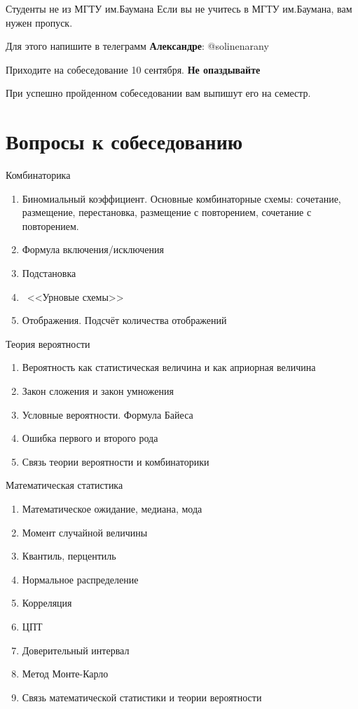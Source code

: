\documentclass{beamer}
\newcommand{\рис}[1]{рис.\ref{#1}}
\newcommand{\Рис}[1]{Рис.\ref{#1}}
\newcommand{\таблицa}[1]{таблица~№\ref{#1}} %
\newcommand{\таблицы}[1]{таблицы~№\ref{#1}} %
\newcommand{\таблице}[1]{таблице~№\ref{#1}} %
\newcommand{\таблицу}[1]{таблицу~№\ref{#1}} %
\newcommand{\таблицей}[1]{таблицей~№\ref{#1}} %
\newcommand{\Таблицa}[1]{Таблица~№\ref{#1}} %
\newcommand{\Таблицы}[1]{Таблицы~№\ref{#1}} %
\newcommand{\Таблице}[1]{Таблице~№\ref{#1}} %
\newcommand{\Таблицу}[1]{Таблицу~№\ref{#1}} %
\newcommand{\Таблицей}[1]{Таблицей~№\ref{#1}} %
\begin{document}
  \begin{frame}{Студенты не из МГТУ им.Баумана}
  Если вы не учитесь в МГТУ им.Баумана, вам нужен пропуск.
  
  Для этого напишите в телеграмм \textbf{Александре}: @solinenarany
  
  Приходите на собеседование 10 сентября. 
  \textbf{Не опаздывайте}
  
  При успешно пройденном собеседовании вам выпишут его на семестр.
  \end{frame}
  
  \section{Вопросы к собеседованию}\label{section:quastions}
  
  \begin{frame}{Комбинаторика}
  \begin{enumerate}
  	\item Биномиальный коэффициент. Основные комбинаторные схемы: сочетание, размещение, перестановка, размещение с повторением, сочетание с повторением.
  	\item Формула включения/исключения
  	\item Подстановка
  	\item ~<<Урновые схемы>>
  	\item Отображения. Подсчёт количества отображений
  \end{enumerate}
  \end{frame}
  
  \begin{frame}{Теория вероятности}
  \begin{enumerate}
    \item Вероятность как статистическая величина и как априорная величина
    \item Закон сложения и закон умножения
    \item Условные вероятности. Формула Байеса
    \item Ошибка первого и второго рода
    \item Связь теории вероятности и комбинаторики
   \end{enumerate}
   \end{frame}
 
  \begin{frame}{Математическая статистика}
  \begin{enumerate}
    \item Математическое ожидание, медиана, мода
    \item Момент случайной величины
    \item Квантиль, перцентиль
    \item Нормальное распределение
    \item Корреляция
    \item ЦПТ
    \item Доверительный интервал
    \item Метод Монте-Карло
    \item Связь математической статистики и теории вероятности
 \end{enumerate}  
\end{frame}
\end{document}
